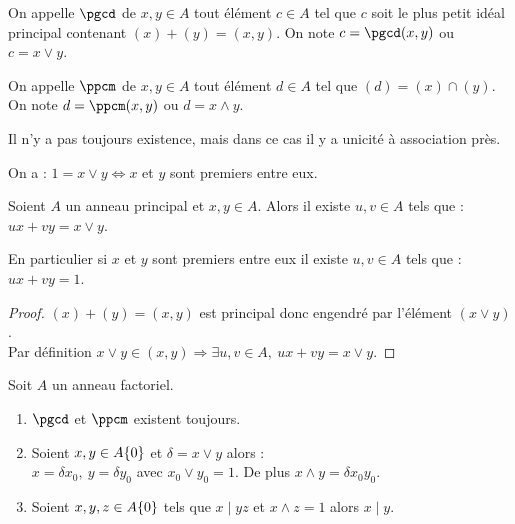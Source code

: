\begin{defi}

On appelle $\pgcd$ de $x,y\in A$ tout élément $c \in A$ tel que $c$ soit le
plus petit idéal principal contenant $(x)+(y) = (x,y)$. On note $c =
\pgcd(x,y)$ ou $c=x\vee y$.

On appelle $\ppcm$ de $x,y\in A$ tout élément $d\in A$ tel que $(d) =
(x)\cap(y)$. On note $d=\ppcm(x,y)$ ou $d = x\wedge y$.
\end{defi}

\begin{example}[Remarques]
Il n'y a pas toujours existence, mais dans ce cas il y a unicité à association
près.

On a : $1=x\vee y \Leftrightarrow x$ et $y$ sont premiers entre eux.
\end{example}

\begin{theo}[Bézout]
 
Soient $A$ un anneau principal et $x,y\in A$. Alors il existe $u,v \in A$ tels
que : $ux + vy = x\vee y$.

En particulier si $x$ et $y$ sont premiers entre eux il existe $u,v \in A$ tels
que : $ux + vy = 1$.
\end{theo}

\begin{proof}
 
$(x)+(y) = (x,y)$ est principal donc engendré par l'élément $(x\vee y)$. \\  
Par définition $x\vee y \in (x,y) \Rightarrow \exists u,v \in A,\ ux + vy =
x\vee y$.
\end{proof}


\begin{prop}

Soit $A$ un anneau factoriel.
\begin{enumerate}
 \item $\pgcd$ et $\ppcm$ existent toujours.
 \item Soient $x,y\in A\-\{0\}$ et $\delta = x\vee y$ alors :\\
       $x = \delta x_0,\ y = \delta y_0$ avec $x_0\vee y_0 = 1$. De plus
$x\wedge y = \delta x_0 y_0$.
 \item Soient $x,y,z\in A \-\{0\}$ tels que $x\mid yz$ et $x\wedge z = 1$ alors
$x\mid y$.
\end{enumerate}
\end{prop}

